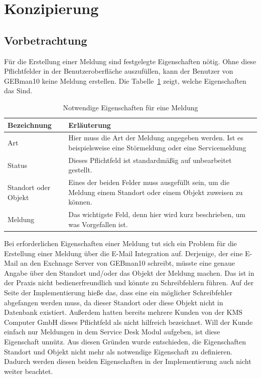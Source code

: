 \section{Konzipierung}

\subsection{Vorbetrachtung}
\noindent
Für die Erstellung einer Meldung sind festgelegte Eigenschaften nötig. Ohne diese Pflichtfelder in der Benutzeroberfläche auszufüllen, kann der Benutzer von GEBman10 keine Meldung erstellen. Die Tabelle~\ref{tab:Medlungseigenschaften} zeigt, welche Eigenschaften das Sind. 

\begin{table}[h!]
    \begin{tabular}{ | l | p{11cm}|}
    \hline
    Bezeichnung & Erläuterung \\ \hline
 Art & Hier muss die Art der Meldung angegeben werden. Ist es beispielsweise eine Störmeldung oder eine Servicemeldung \\ \hline
 Status & Dieses Pflichtfeld ist standardmäßig auf unbearbeitet gestellt.  \\ \hline
Standort oder Objekt & Eines der beiden Felder muss ausgefüllt sein, um die Meldung einem Standort oder einem Objekt zuweisen zu können. \\ \hline
Meldung & Das wichtigste Feld, denn hier wird kurz beschrieben, um was Vorgefallen ist. \\ \hline
    \end{tabular}
    \caption{Notwendige Eigenschaften für eine Meldung}
    \label{tab:Medlungseigenschaften}
\end{table}

\noindent
Bei erforderlichen Eigenschaften einer Meldung tut sich ein Problem für die Erstellung einer Meldung über die E-Mail Integration auf. Derjenige, der eine E-Mail an den Exchnage Server von GEBman10 schreibt, müsste eine genaue Angabe über den Standort und/oder das Objekt der Meldung machen. Das ist in der Praxis nicht bedienerfreundlich und könnte zu Schreibfehlern führen. Auf der Seite der Implementierung hieße das, dass eine ein möglicher Schreibfehler abgefangen werden muss, da dieser Standort oder diese Objekt nicht in Datenbank existiert. Außerdem hatten bereits mehrere Kunden von der KMS Computer GmbH dieses Pflichtfeld als nicht hilfreich bezeichnet. Will der Kunde einfach nur Meldungen in dem Service Desk Modul aufgeben, ist diese Eigenschaft unnütz. Aus diesen Gründen wurde entschieden, die Eigenschaften Standort und Objekt nicht mehr als notwendige Eigenschaft zu definieren. Dadurch werden diesen beiden Eigenschaften in der Implementierung auch nicht weiter beachtet.

